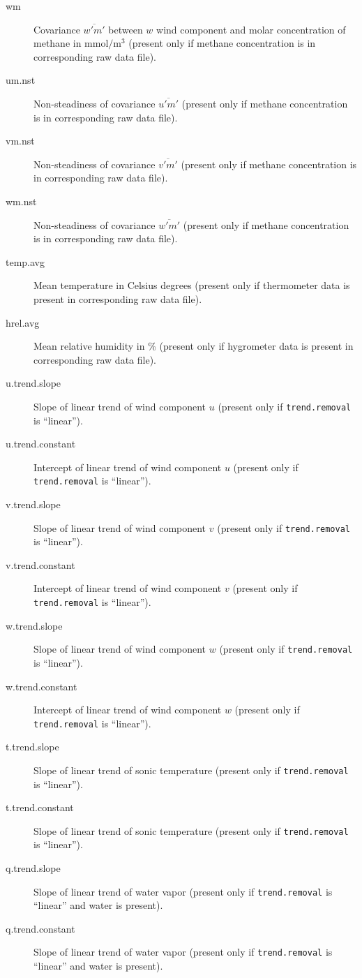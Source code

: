 \documentclass[a4paper,10pt]{book}
\begin{document}
\begin{description}
 \item[wm] Covariance $\overline{w'm'}$ between $w$ wind component and molar concentration of methane in $\mbox{mmol}/\mbox{m}^{3}$ (present only if methane concentration is in corresponding raw data file).
 \item[um.nst] Non-steadiness of covariance $\overline{u'm'}$ (present only if methane concentration is in corresponding raw data file).
 \item[vm.nst] Non-steadiness of covariance $\overline{v'm'}$ (present only if methane concentration is in corresponding raw data file).
 \item[wm.nst] Non-steadiness of covariance $\overline{w'm'}$ (present only if methane concentration is in corresponding raw data file).
 \item[temp.avg] Mean temperature in Celsius degrees (present only if thermometer data is present in corresponding raw data file).
 \item[hrel.avg] Mean relative humidity in \% (present only if hygrometer data is present in corresponding raw data file).
 \item[u.trend.slope] Slope of linear trend of wind component $u$ (present only if \verb|trend.removal| is ``linear'').
 \item[u.trend.constant] Intercept of linear trend of wind component $u$ (present only if \verb|trend.removal| is ``linear'').
 \item[v.trend.slope] Slope of linear trend of wind component $v$ (present only if \verb|trend.removal| is ``linear'').
 \item[v.trend.constant] Intercept of linear trend of wind component $v$ (present only if \verb|trend.removal| is ``linear'').
 \item[w.trend.slope] Slope of linear trend of wind component $w$ (present only if \verb|trend.removal| is ``linear'').
 \item[w.trend.constant] Intercept of linear trend of wind component $w$ (present only if \verb|trend.removal| is ``linear'').
 \item[t.trend.slope] Slope of linear trend of sonic temperature (present only if \verb|trend.removal| is ``linear'').
 \item[t.trend.constant] Slope of linear trend of sonic temperature (present only if \verb|trend.removal| is ``linear'').
 \item[q.trend.slope] Slope of linear trend of water vapor (present only if \verb|trend.removal| is ``linear'' and water is present).
 \item[q.trend.constant] Slope of linear trend of water vapor (present only if \verb|trend.removal| is ``linear'' and water is present).

\end{description}
\end{document}
